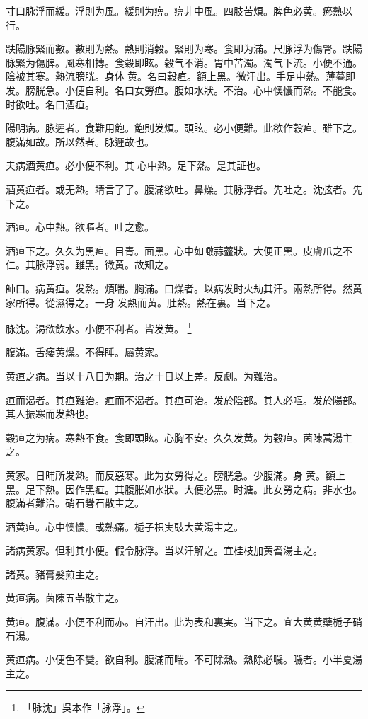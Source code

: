 寸口脉浮而緩。浮則为風。緩則为痹。痹非中風。四肢苦煩。脾色必黄。瘀熱以行。

趺陽脉緊而數。數則为熱。熱則消穀。緊則为寒。食即为滿。尺脉浮为傷腎。趺陽脉緊为傷脾。風寒相摶。食穀即眩。穀气不消。胃中苦濁。濁气下流。小便不通。陰被其寒。熱流膀胱。身体{\sungii 𥁞}黄。名曰穀疸。額上黑。微汗出。手足中熱。薄暮即发。膀胱急。小便自利。名曰女勞疸。腹如水狀。不治。心中懊憹而熱。不能食。时欲吐。名曰酒疸。

陽明病。脉遲者。食難用飽。飽則发煩。頭眩。必小便難。此欲作穀疸。雖下之。腹滿如故。所以然者。脉遲故也。

夫病酒黄疸。必小便不利。其{\sungii 𠊱}心中熱。足下熱。是其証也。

酒黄疸者。或无熱。靖言了{\khaai 了}。腹滿欲吐。鼻燥。其脉浮者。先吐之。沈弦者。先下之。

酒疸。心中熱。欲嘔者。吐之愈。

酒疸下之。久久为黑疸。目青。面黑。心中如噉蒜虀狀。大便正黑。皮膚爪之不仁。其脉浮弱。雖黑。微黄。故知之。

師曰。病黄疸。发熱。煩喘。胸滿。口燥者。以病发时火劫其汗。兩熱所得。然黄家所得。從濕得之。一身{\sungii 𥁞}发熱而黄。肚熱。熱在裏。当下之。

脉沈。渴欲飲水。小便不利者。皆发黄。
	\footnote{
		「脉沈」吳本作「脉浮」。
	}

腹滿。舌痿黄燥。不得睡。屬黄家。

黄疸之病。当以十八日为期。治之十日以上差。反劇。为難治。

疸而渴者。其疸難治。疸而不渴者。其疸可治。发於陰部。其人必嘔。{\khaai 发於}陽部。其人振寒而发熱也。

穀疸之为病。寒熱不食。食即頭眩。心胸不安。久久发黄。为穀疸。茵陳蒿湯主之。

黄家。日晡所发熱。而反惡寒。此为女勞得之。膀胱急。少腹滿。身{\sungii 𥁞}黄。額上黑。足下熱。因作黑疸。其腹胀如水狀。大便必黑。时溏。此女勞之病。非水也。腹滿者難治。硝石礬石散主之。

酒黄疸。心中懊憹。或熱痛。栀子{\khaai 枳実豉}大黄湯主之。

諸病黄家。但利其小便。假令脉浮。当以汗解之。宜桂枝加黄耆湯主之。

諸黄。豬膏髮煎主之。

黄疸病。茵陳五苓散主之。

黄疸。腹滿。小便不利而赤。自汗出。此为表和裏実。当下之。宜大黄{\khaai 黄蘗栀子}硝石湯。

黄疸病。小便色不變。欲自利。腹滿而喘。不可除熱。熱除必噦。噦者。小半夏湯主之。

